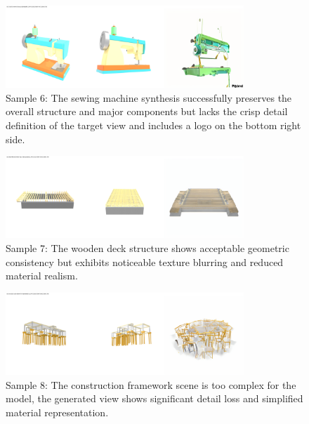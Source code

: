 \begin{figure}[htbp]
  \centering
  \includegraphics[width=0.8\textwidth, trim=0 0 0 20pt, clip]{images/experiments/samples/comparison_batch0012_uid_75d5f734-a64e-576b-a0c3-faf3f8dfdf08.png}
  \caption{Sample 6: The sewing machine synthesis successfully preserves the overall structure and major components but lacks the crisp detail definition of the target view and includes a logo on the bottom right side.}
  \label{fig:sample_6}
\end{figure}

\begin{figure}[htbp]
  \centering
  \includegraphics[width=0.8\textwidth, trim=0 0 0 20pt, clip]{images/experiments/samples/comparison_batch0000_uid_98b2449b-8234-58d7-bacc-1a80cb2db00a.png}
  \caption{Sample 7: The wooden deck structure shows acceptable geometric consistency but exhibits noticeable texture blurring and reduced material realism.}
  \label{fig:sample_7}
\end{figure}

\begin{figure}[htbp]
  \centering
  \includegraphics[width=0.8\textwidth, trim=0 0 0 20pt, clip]{images/experiments/samples/comparison_batch0048_uid_6e1d36c3-c5d0-588b-8919-f0ae9b96b97a.png}
  \caption{Sample 8: The construction framework scene is too complex for the model, the generated view shows significant detail loss and simplified material representation.}
  \label{fig:sample_8}
\end{figure}

